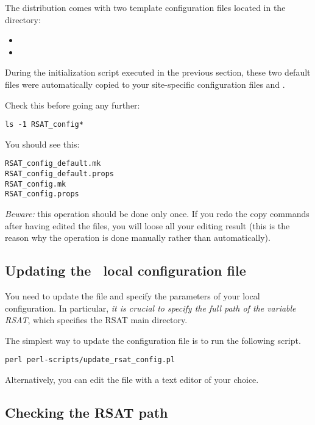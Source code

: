 \documentclass[12pt,a4paper, oneside]{scrreprt} %
\begin{document}
The \RSAT distribution comes with two template configuration files
located in the  directory:

\begin{itemize}
\item {} 
\item {}
\end{itemize}

During the initialization script executed in the previous section,
these two default files were automatically copied to your
site-specific configuration files  and
.

Check this before going any further: 

\begin{lstlisting}
ls -1 RSAT_config*
\end{lstlisting}

You should see this:
\begin{verbatim}
RSAT_config_default.mk
RSAT_config_default.props
RSAT_config.mk
RSAT_config.props
\end{verbatim}

\emph{Beware:} this operation should be done only once. If you redo
the copy commands after having edited the files, you will loose all
your editing result (this is the reason why the operation is done
manually rather than automatically).

\subsection{Updating the \RSAT\ local configuration file}

You need to update the file  and specify the
parameters of your local configuration. In particular, \emph{it is
  crucial to specify the full path of the variable RSAT}, which
specifies the RSAT main directory.

The simplest way to update the configuration file is to run the following script.

\begin{lstlisting}
perl perl-scripts/update_rsat_config.pl
\end{lstlisting}

Alternatively, you can edit the file  with a
text editor of your choice.


\subsection{Checking the RSAT path}
\end{document}
